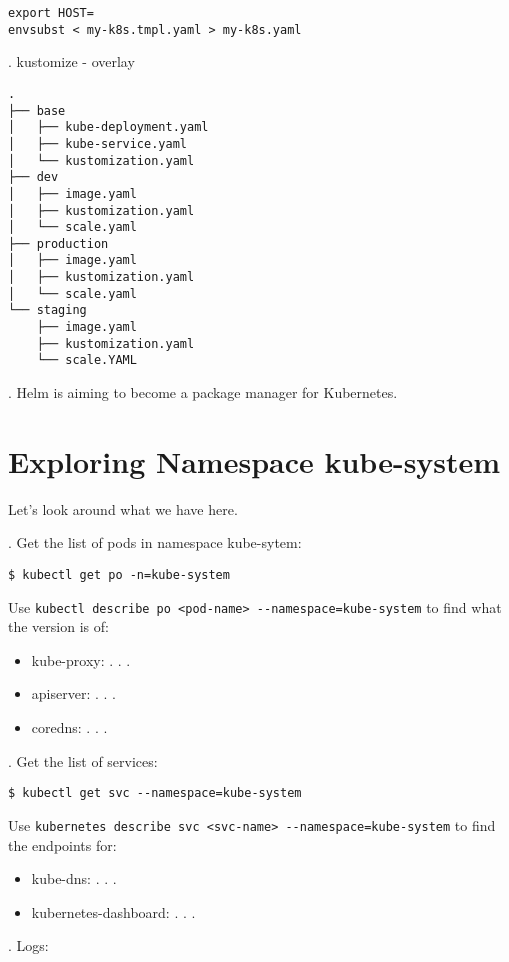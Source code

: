 \documentclass[12pt, letterpaper]{article}
\begin{document}
\begin{verbatim}
export HOST=
envsubst < my-k8s.tmpl.yaml > my-k8s.yaml
\end{verbatim}

. kustomize - overlay
\begin{verbatim}
.
├── base
│   ├── kube-deployment.yaml
│   ├── kube-service.yaml
│   └── kustomization.yaml
├── dev
│   ├── image.yaml
│   ├── kustomization.yaml
│   └── scale.yaml
├── production
│   ├── image.yaml
│   ├── kustomization.yaml
│   └── scale.yaml
└── staging
    ├── image.yaml
    ├── kustomization.yaml
    └── scale.YAML
\end{verbatim}


. Helm is aiming to become a package manager for Kubernetes.

%
%
\section{Exploring Namespace kube-system}

Let's look around what we have here.

. Get the list of pods in namespace kube-sytem:

\begin{verbatim}
$ kubectl get po -n=kube-system
\end{verbatim}

Use \verb|kubectl describe po <pod-name> --namespace=kube-system| to find what the version is of:
\begin{itemize}
    \item kube-proxy: . . .
    \item apiserver: . . .
    \item coredns: . . .
\end{itemize}

. Get the list of services:

\begin{verbatim}
$ kubectl get svc --namespace=kube-system
\end{verbatim}

Use \verb|kubernetes describe svc <svc-name> --namespace=kube-system| to find the endpoints for:
\begin{itemize}
\item kube-dns: . . .
\item kubernetes-dashboard: . . .
\end{itemize}

. Logs:
\end{document}
